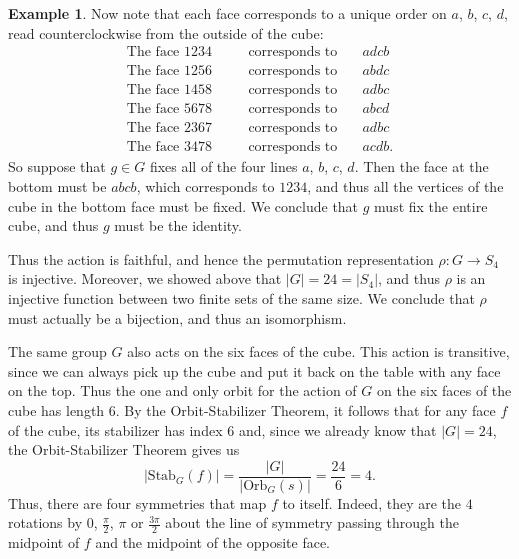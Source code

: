 \documentclass[12pt]{report}
\numberwithin{equation}{section}
\numberwithin{theorem}{chapter}
\theoremstyle{definition}
\newtheorem{example}[theorem]{Example}
\newtheorem*{basic properties}{Basic Properties}
\newtheorem*{Important Remark}{Important Remark}
\begin{document}
\begin{example}
Now note that each face corresponds to a unique order on $a$, $b$, $c$, $d$, read counterclockwise from the outside of the cube:
$$\begin{aligned}
	\text{The face } 1234 && \hspace{1em}\text{corresponds to} \hspace{1em} & adcb\\
	\text{The face } 1256 && \hspace{1em}\text{corresponds to} \hspace{1em} & abdc \\
	\text{The face } 1458 && \hspace{1em}\text{corresponds to} \hspace{1em} & adbc \\
	\text{The face } 5678 && \hspace{1em}\text{corresponds to} \hspace{1em} & abcd \\
	\text{The face } 2367 && \hspace{1em}\text{corresponds to} \hspace{1em} & adbc \\
	\text{The face } 3478 && \hspace{1em}\text{corresponds to} \hspace{1em} & acdb.	
\end{aligned}$$
So suppose that $g \in G$ fixes all of the four lines $a$, $b$, $c$, $d$. Then the face at the bottom must be $abcb$, which corresponds to $1234$, and thus all the vertices of the cube in the bottom face must be fixed. We conclude that $g$ must fix the entire cube, and thus $g$ must be the identity.



Thus the action is faithful, and hence the permutation representation $\rho\!: G\to S_4$ is injective. Moreover, we showed above that $|G|=24=|S_4|$, and thus $\rho$ is an injective function between two finite sets of the same size. We conclude that $\rho$ must actually be a bijection, and thus an isomorphism.



The same group $G$ also acts on the six faces of the cube. This action is transitive, since we can always pick up the cube and put it back on the table with any face on the top. Thus the one and only orbit for the action of $G$ on the six faces of the cube has length $6$. By the Orbit-Stabilizer Theorem, it follows that for any face $f$ of the cube, its stabilizer has index $6$ and, since we already know that $|G|= 24$, the Orbit-Stabilizer Theorem gives us
$$|\mathrm{Stab}_G(f)| = \frac{|G|}{|\mathrm{Orb}_G(s)|} = \frac{24}{6} = 4.$$ 
Thus, there are four symmetries that map $f$ to itself. Indeed, they are the $4$ rotations by $0$, $\frac{\pi}{2}$, $\pi$ or $\frac{3\pi}{2}$ about the line of symmetry passing through the midpoint of $f$ and the midpoint of the opposite face.
\end{example}
\end{document}
